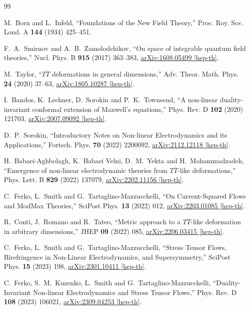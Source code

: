 \documentclass[a4paper,11pt]{ltjsarticle}
\numberwithin{equation}{section}
\begin{document}
\small
\begin{thebibliography}{99}

M.~Born and L.~Infeld,
``Foundations of the New Field Theory,''
Proc. Roy. Soc. Lond. A \textbf{144} (1934) 425--451.

F.~A.~Smirnov and A.~B.~Zamolodchikov,
``On space of integrable quantum field theories,''
Nucl. Phys. B \textbf{915} (2017) 363--383,
\href{https://arxiv.org/abs/1608.05499}{arXiv:1608.05499 [hep-th]}.

M.~Taylor,
``$T\overline T$ deformations in general dimensions,''
Adv. Theor. Math. Phys. \textbf{24} (2020) 37--63,
\href{https://arxiv.org/abs/1805.10287}{arXiv:1805.10287 [hep-th]}.

I.~Bandos, K.~Lechner, D.~Sorokin and P.~K.~Townsend,
``A non-linear duality-invariant conformal extension of Maxwell's equations,''
Phys. Rev. D \textbf{102} (2020) 121703,
\href{https://arxiv.org/abs/2007.09092}{arXiv:2007.09092 [hep-th]}.

D.~P.~Sorokin,
``Introductory Notes on Non-linear Electrodynamics and its Applications,''
Fortsch. Phys. \textbf{70} (2022) 2200092,
\href{https://arxiv.org/abs/2112.12118}{arXiv:2112.12118 [hep-th]}.

H.~Babaei-Aghbolagh, K.~Babaei Velni, D.~M.~Yekta and H.~Mohammadzadeh,
``Emergence of non-linear electrodynamic theories from $T\overline T$-like deformations,''
Phys. Lett. B \textbf{829} (2022) 137079,
\href{https://arxiv.org/abs/2202.11156}{arXiv:2202.11156 [hep-th]}.

C.~Ferko, L.~Smith and G.~Tartaglino-Mazzucchelli,
``On Current-Squared Flows and ModMax Theories,''
SciPost Phys. \textbf{13} (2022) 012,
\href{https://arxiv.org/abs/2203.01085}{arXiv:2203.01085 [hep-th]}.

R.~Conti, J.~Romano and R.~Tateo,
``Metric approach to a $T\overline T$-like deformation in arbitrary dimensions,''
JHEP \textbf{09} (2022) 085,
\href{https://arxiv.org/abs/2206.03415}{arXiv:2206.03415 [hep-th]}.

C.~Ferko, L.~Smith and G.~Tartaglino-Mazzucchelli,
``Stress Tensor Flows, Birefringence in Non-Linear Electrodynamics, and Supersymmetry,''
SciPost Phys. \textbf{15} (2023) 198,
\href{https://arxiv.org/abs/2301.10411}{arXiv:2301.10411 [hep-th]}.

C.~Ferko, S.~M.~Kuzenko, L.~Smith and G.~Tartaglino-Mazzucchelli,
``Duality-Invariant Non-linear Electrodynamics and Stress Tensor Flows,''
Phys. Rev. D \textbf{108} (2023) 106021,
\href{https://arxiv.org/abs/2309.04253}{arXiv:2309.04253 [hep-th]}.



\end{thebibliography}
\end{document}
